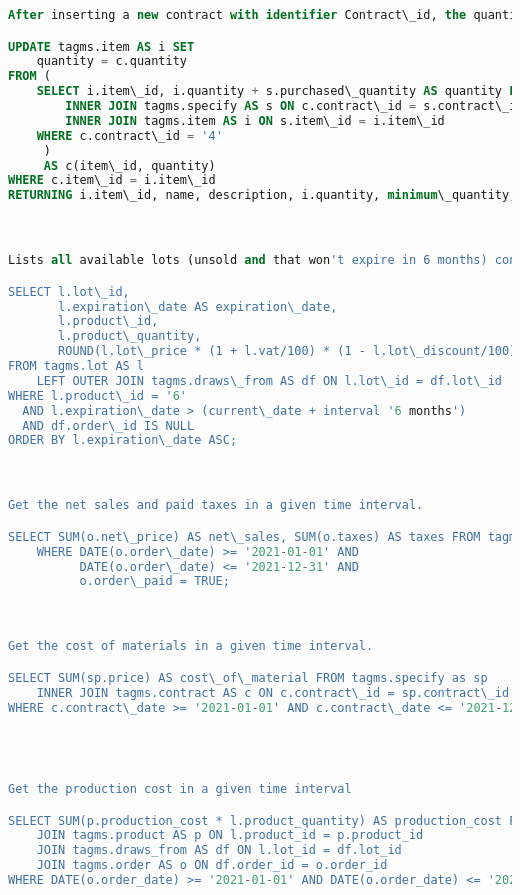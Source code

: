 \begin{lstlisting}[language=SQL,
keywordstyle=\color{blue},
stringstyle=\color{mauve},
showstringspaces=false,
basicstyle=\ttfamily\footnotesize]
After inserting a new contract with identifier Contract\_id, the quantities of items in stock must be incremented in the delivery date.

UPDATE tagms.item AS i SET
    quantity = c.quantity
FROM (
    SELECT i.item\_id, i.quantity + s.purchased\_quantity AS quantity FROM tagms.contract AS c
        INNER JOIN tagms.specify AS s ON c.contract\_id = s.contract\_id
        INNER JOIN tagms.item AS i ON s.item\_id = i.item\_id
    WHERE c.contract\_id = '4'
     )
     AS c(item\_id, quantity)
WHERE c.item\_id = i.item\_id
RETURNING i.item\_id, name, description, i.quantity, minimum\_quantity, item\_category\_id;



Lists all available lots (unsold and that won't expire in 6 months) containing a particular product having a given Product\_id as identifier, sorted by expiration date (oldest lots must be sold first).

SELECT l.lot\_id,
       l.expiration\_date AS expiration\_date,
       l.product\_id,
       l.product\_quantity,
       ROUND(l.lot\_price * (1 + l.vat/100) * (1 - l.lot\_discount/100), 2) AS gross\_price
FROM tagms.lot AS l
    LEFT OUTER JOIN tagms.draws\_from AS df ON l.lot\_id = df.lot\_id
WHERE l.product\_id = '6'
  AND l.expiration\_date > (current\_date + interval '6 months')
  AND df.order\_id IS NULL
ORDER BY l.expiration\_date ASC;



Get the net sales and paid taxes in a given time interval.

SELECT SUM(o.net\_price) AS net\_sales, SUM(o.taxes) AS taxes FROM tagms.order AS o
    WHERE DATE(o.order\_date) >= '2021-01-01' AND
          DATE(o.order\_date) <= '2021-12-31' AND
          o.order\_paid = TRUE;



Get the cost of materials in a given time interval.

SELECT SUM(sp.price) AS cost\_of\_material FROM tagms.specify as sp
    INNER JOIN tagms.contract AS c ON c.contract\_id = sp.contract\_id
WHERE c.contract\_date >= '2021-01-01' AND c.contract\_date <= '2021-12-31';




Get the production cost in a given time interval

SELECT SUM(p.production_cost * l.product_quantity) AS production_cost FROM tagms.lot AS l
    JOIN tagms.product AS p ON l.product_id = p.product_id
    JOIN tagms.draws_from AS df ON l.lot_id = df.lot_id
    JOIN tagms.order AS o ON df.order_id = o.order_id
WHERE DATE(o.order_date) >= '2021-01-01' AND DATE(o.order_date) <= '2021-12-31';




\end{lstlisting}
